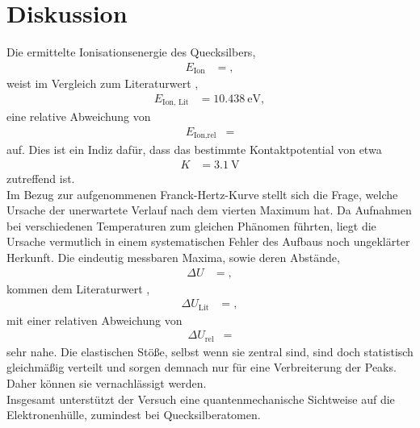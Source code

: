 \section{Diskussion}
\label{sec:Diskussion}

Die ermittelte Ionisationsenergie des Quecksilbers,
\begin{align*}
  E_{\text{Ion}} &= ,
\end{align*}
weist im Vergleich zum Literaturwert \cite{ionisationsenergie},
\begin{align*}
  E_{\text{Ion, Lit}} &= \SI{10.438}{\electronvolt},
\end{align*}
eine relative Abweichung von
\begin{align*}
  E_{\text{Ion,rel}} &= 
\end{align*}
auf.
Dies ist ein Indiz dafür, dass das bestimmte Kontaktpotential von etwa
\begin{align*}
  K &= \SI{3.1}{\volt}
\end{align*}
zutreffend ist.\\
Im Bezug zur aufgenommenen Franck-Hertz-Kurve stellt sich die Frage, welche Ursache der unerwartete Verlauf nach dem vierten Maximum hat.
Da Aufnahmen bei verschiedenen Temperaturen zum gleichen Phänomen führten, liegt die Ursache vermutlich in einem systematischen Fehler des Aufbaus noch ungeklärter Herkunft.
Die eindeutig messbaren Maxima, sowie deren Abstände,
\begin{align*}
  \Delta U &= ,
\end{align*}
kommen dem Literaturwert \cite{anregungsenergie},
\begin{align*}
  \Delta U_{\text{Lit}} &= ,
\end{align*}
mit einer relativen Abweichung von
\begin{align*}
  \Delta U_{\text{rel}} &= 
\end{align*}
sehr nahe.
Die elastischen Stöße, selbst wenn sie zentral sind, sind doch statistisch gleichmäßig verteilt und sorgen demnach nur für eine Verbreiterung der Peaks.
Daher können sie vernachlässigt werden.\\
Insgesamt unterstützt der Versuch eine quantenmechanische Sichtweise auf die Elektronenhülle, zumindest bei Quecksilberatomen.
